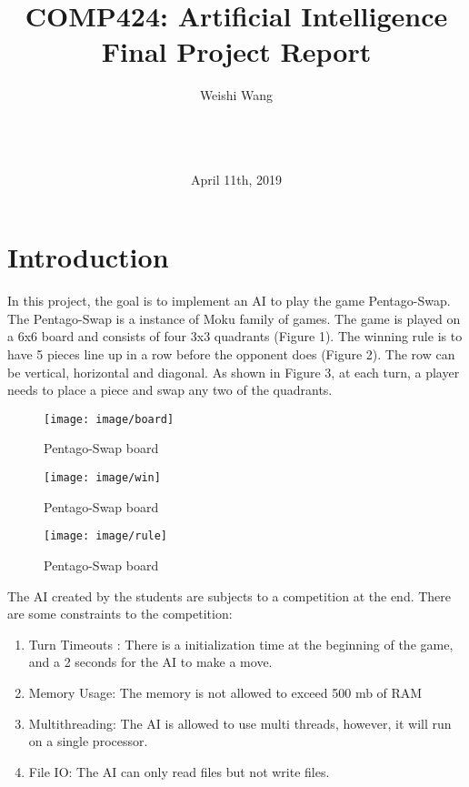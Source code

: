 \documentclass[a4paper,titlepage]{article}
\title{\textbf{COMP424: Artificial Intelligence\\ Final Project Report}}
\author{
    Weishi Wang\\
    \text{260540022}\\
    \text{wei.s.wang@mail.mcgill.ca}\\
            \text{}\\
}
\date{April 11th, 2019}
\begin{document}
\sloppy

\maketitle
\clearpage

\twocolumn

\section{Introduction}
In this project, the goal is to implement an AI to play the game Pentago-Swap. The Pentago-Swap is a instance of Moku family of games. The game is played on a 6x6 board and consists of four 3x3 quadrants (Figure 1). The winning rule is to have 5 pieces line up in a row before the opponent does (Figure 2). The row can be vertical, horizontal and diagonal. As shown in Figure 3, at each turn, a player needs to place a piece and swap any two of the quadrants.\\

\begin{figure}[!htb]
  \centering
  \texttt{[image: image/board]}
  \caption{Pentago-Swap board}
\end{figure}

\begin{figure}[!htb]
  \centering
  \texttt{[image: image/win]}
  \caption{Pentago-Swap board}
\end{figure}

\begin{figure}[!htb]
  \centering
  \texttt{[image: image/rule]}
  \caption{Pentago-Swap board}
\end{figure}


The AI created by the students are subjects to a competition at the end. There are some constraints to the competition:

\begin{enumerate}
\item Turn Timeouts : There is a initialization time at the beginning of the game, and a 2 seconds for the AI to make a move.
\item Memory Usage: The memory is not allowed to exceed 500 mb of RAM
\item Multithreading: The AI is allowed to use multi threads, however, it will run on a single processor.
\item File IO: The AI can only read files but not write files.
\end{enumerate}
\end{document}

